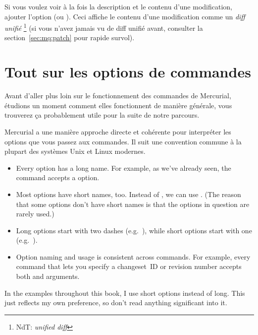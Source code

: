 Si vous voulez voir à la fois la description et le contenu d'une                                                                       
modification, ajouter l'option  (ou ).                                                              
Ceci affiche le contenu d'une modification comme un \emph{diff unifié}                                                                 
\footnote{NdT: \textit{unified diff}} (si vous n'avez jamais vu de diff                                                                
unifié avant, consulter la section~\ref{sec:mq:patch} pour rapide                                                                      
survol).


\section{Tout sur les options de commandes}

Avant d'aller plus loin sur le fonctionnement des commandes de Mercurial,
étudions un moment comment elles fonctionnent de manière générale, vous
trouverez ça probablement utile pour la suite de notre parcours.

Mercurial a une manière approche directe et cohérente pour interpréter
les options que vous passez aux commandes. Il suit une convention commune
à la plupart des systèmes Unix et Linux modernes.

\begin{itemize}
\item Every option has a long name.  For example, as we've already
  seen, the  command accepts a  option.
\item Most options have short names, too.  Instead of
  , we can use .  (The reason that
  some options don't have short names is that the options in question
  are rarely used.)
\item Long options start with two dashes (e.g.~),
  while short options start with one (e.g.~).
\item Option naming and usage is consistent across commands.  For
  example, every command that lets you specify a changeset~ID or
  revision number accepts both  and 
  arguments.
\end{itemize}
In the examples throughout this book, I use short options instead of
long.  This just reflects my own preference, so don't read anything
significant into it.

